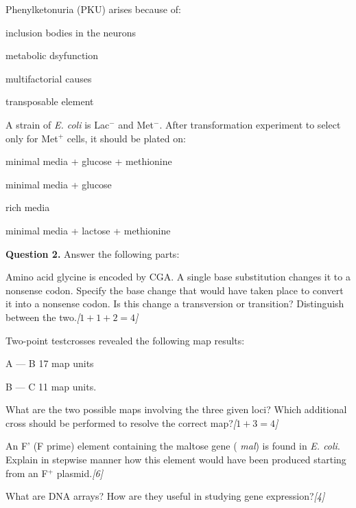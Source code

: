 \documentclass[11pt,a4paper]{article}
\newcommand{\pts}[1]{\hfill   \textit{[#1]}}
\begin{document}
\begin{parts}
\begin{parts}
    \item Phenylketonuria (PKU) arises because of:
    
\begin{parts}
      \item inclusion bodies in the neurons
      \item metabolic dsyfunction
      \item multifactorial causes
      \item transposable element
    \end{parts}

    \item A strain of   \textit{E. coli} is Lac$^-$ and Met$^-$. After transformation experiment to select only for Met$^+$ cells, it should be plated on:
    
\begin{parts}
      \item minimal media + glucose + methionine
      \item minimal media + glucose
      \item rich media
      \item minimal media + lactose + methionine
    \end{parts}
  \end{parts}
\end{parts}

\medskip


\noindent   \textbf{Question 2.} Answer the following parts:

\begin{parts}
  \item Amino acid glycine is encoded by CGA. A single base substitution changes it to a nonsense codon. Specify the base change that would have taken place to convert it into a nonsense codon. Is this change a transversion or transition? Distinguish between the two.\pts{$1 + 1 + 2 = 4$}
  \item Two-point testcrosses revealed the following map results:
  
\begin{parts}
    \item A --- B 17 map units
    \item B --- C 11 map units.
  \end{parts}
  What are the two possible maps involving the three given loci? Which additional cross should be performed to resolve the correct map?\pts{$1 + 3 = 4$}
  \item An F' (F prime) element containing the maltose gene (   \textit{mal}) is found in   \textit{E. coli}. Explain in stepwise manner how this element would have been produced starting from an F$^+$ plasmid.\pts{6}
  \item What are DNA arrays? How are they useful in studying gene expression?\pts{4}
\end{parts}
\end{document}
